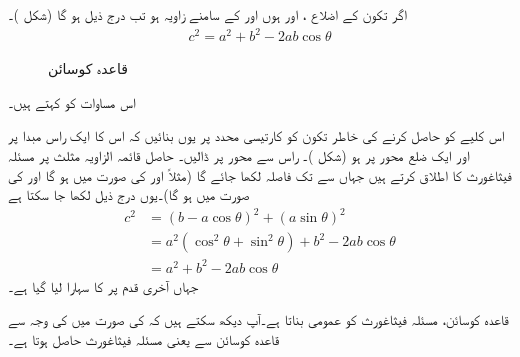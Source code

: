 اگر تکون  کے اضلاع ،  اور  ہوں اور  کے سامنے  زاویہ  ہو تب درج ذیل ہو گا (شکل )۔
\begin{align}
c^2=a^2+b^2-2ab\cos \theta
\end{align}
%
\begin{figure}
\centering
{}
\caption{قاعدہ کوسائن}
\label{شکل_ابتدا_قاعدہ_کوسائن}
\end{figure}
اس مساوات کو  کہتے ہیں۔

اس کلیے کو حاصل کرنے کی خاطر تکون کو کارتیسی محدد پر یوں بنائیں کہ اس کا ایک راس مبدا پر اور ایک ضلع محور  پر ہو (شکل )۔ راس  سے محور  پر  ڈالیں۔  حاصل قائمہ الزاویہ مثلث  پر مسئلہ فیثاغورث کا اطلاق کرتے ہیں جہاں   سے  تک فاصلہ  لکھا جائے گا (مثلاً  اور  کی صورت میں  ہو گا اور  کی صورت میں  ہو گا)۔یوں درج ذیل لکھا جا سکتا ہے
\begin{align*}
c^2&=(b-a\cos\theta)^2+(a\sin\theta)^2\\
&=a^2(\cos^2\theta+\sin^2\theta)+b^2-2ab\cos\theta\\
&=a^2+b^2-2ab\cos\theta
\end{align*}
جہاں آخری قدم پر  کا سہارا لیا گیا ہے۔

قاعدہ کوسائن، مسئلہ فیثاغورث کو عمومی بناتا ہے۔آپ دیکھ سکتے ہیں کہ  کی صورت میں  کی وجہ سے  قاعدہ کوسائن سے   یعنی مسئلہ فیثاغورث  حاصل ہوتا ہے۔

\\

